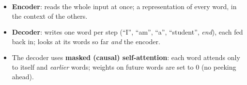 \documentclass[10pt]{beamer}
\begin{document}
\begin{frame}[fragile]
\vspace{4pt}
\begin{itemize}
\item \textbf{Encoder}: reads the whole input at once; a representation of
  every word, in the context of the others.
\item \textbf{Decoder}: writes one word per step (``I'', ``am'', ``a'',
  ``student'', \textit{end}), each fed back in; looks at its words so far
  \emph{and} the encoder.
\item The decoder uses \textbf{masked (causal) self-attention}: each word
  attends only to itself and \emph{earlier} words; weights on future words
  are set to 0 (no peeking ahead).
\end{itemize}

\end{frame}
\end{document}
